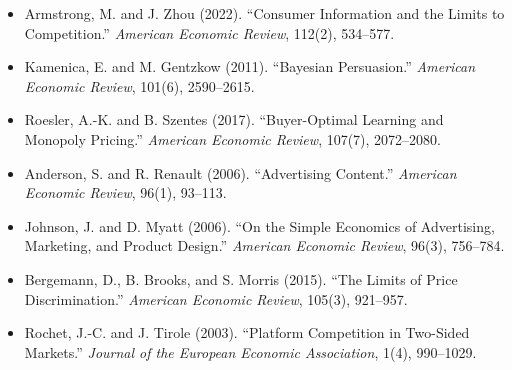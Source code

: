 \documentclass[12pt, a4paper]{article}
\begin{document}
\begin{itemize}[nosep, leftmargin=*]
    \item Armstrong, M. and J. Zhou (2022). ``Consumer Information and the Limits to Competition.'' \textit{American Economic Review}, 112(2), 534--577.
    \item Kamenica, E. and M. Gentzkow (2011). ``Bayesian Persuasion.'' \textit{American Economic Review}, 101(6), 2590--2615.
    \item Roesler, A.-K. and B. Szentes (2017). ``Buyer-Optimal Learning and Monopoly Pricing.'' \textit{American Economic Review}, 107(7), 2072--2080.
    \item Anderson, S. and R. Renault (2006). ``Advertising Content.'' \textit{American Economic Review}, 96(1), 93--113.
    \item Johnson, J. and D. Myatt (2006). ``On the Simple Economics of Advertising, Marketing, and Product Design.'' \textit{American Economic Review}, 96(3), 756--784.
    \item Bergemann, D., B. Brooks, and S. Morris (2015). ``The Limits of Price Discrimination.'' \textit{American Economic Review}, 105(3), 921--957.
    \item Rochet, J.-C. and J. Tirole (2003). ``Platform Competition in Two-Sided Markets.'' \textit{Journal of the European Economic Association}, 1(4), 990--1029.
\end{itemize}
\end{document}
